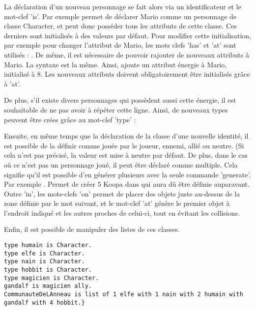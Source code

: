 La déclaration d'un nouveau personnage se fait alors via un identificateur et le mot-clef 'is'.
Par exemple  permet de déclarer Mario comme un personnage de classe Character, 
et peut donc posséder tous les attributs de cette classe. Ces derniers sont initialisés à des valeurs par défaut.
Pour modifier cette initialisation, par exemple pour changer l'attribut  de Mario, les mots clefs 'has' et 'at' sont utilisés : 
.
De même, il est nécessaire de pouvoir rajouter de nouveaux attributs à Mario.
La syntaxe est la même. Ainsi,  ajoute un attribut énergie à Mario, initialisé à 8.
Les nouveaux attributs doivent obligatoirement être initialisés grâce à 'at'.

De plus, s'il existe divers personnages qui possèdent aussi cette énergie, il est souhaitable de ne pas avoir à répéter cette ligne.
Ainsi, de nouveaux types peuvent être crées grâce au mot-clef 'type' :

Ensuite, en même temps que la déclaration de la classe d'une nouvelle identité, il est possible de la définir comme jouée par le joueur, ennemi, allié ou neutre.
(Si cela n'est pas précisé, la valeur est mise à neutre par défaut.
De plus, dans le cas où ce n'est pas un personnage joué, il peut être déclaré comme multiple.
Cela signifie qu'il est possible d'en générer plusieurs avec la seule commande 'generate'.
Par exemple  . Permet de créer 5 Koopa dans  qui aura dû être définie
auparavant. Outre 'in', les mots-clefs 'on' permet de placer des objets juste au-dessus de la zone définie par le mot suivant, et le mot-clef 'at' génère
le premier objet à l'endroit indiqué et les autres proches de celui-ci, tout en évitant les collisions.

Enfin, il est possible de manipuler des listes de ces classes.
\begin{lstlisting}[language=GameGrammar]
type humain is Character. 
type elfe is Character. 
type nain is Character. 
type hobbit is Character. 
type magicien is Character. 
gandalf is magicien ally.
CommunauteDeLAnneau is list of 1 elfe with 1 nain with 2 humain with gandalf with 4 hobbit.}
\end{lstlisting}

